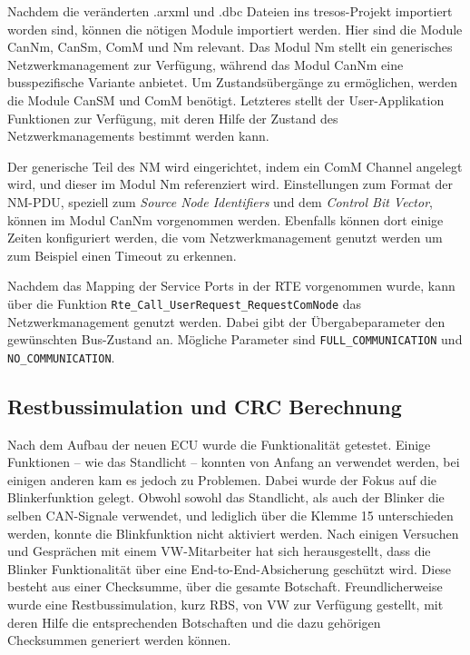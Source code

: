 \documentclass[
  a4paper,					    %
  twoside,
  DIV=calc,     				%
  bibliography=totoc,
  cleardoublepage=empty,
  ngerman,     					%
  final       					%
]{scrbook}
\begin{document}
Nachdem die veränderten .arxml und .dbc Dateien ins tresos-Projekt importiert worden sind, können die nötigen Module importiert werden. Hier sind die Module CanNm, CanSm, ComM und Nm relevant. Das Modul Nm stellt ein generisches Netzwerkmanagement zur Verfügung, während das Modul CanNm eine busspezifische Variante anbietet. Um Zustandsübergänge zu ermöglichen, werden die Module CanSM und ComM benötigt. Letzteres stellt der User-Applikation Funktionen zur Verfügung, mit deren Hilfe der Zustand des Netzwerkmanagements bestimmt werden kann.

Der generische Teil des NM wird eingerichtet, indem ein ComM Channel angelegt wird, und dieser im Modul Nm referenziert wird. Einstellungen zum Format der NM-PDU, speziell zum \emph{Source Node Identifiers} und dem \emph{Control Bit Vector}, können im Modul CanNm vorgenommen werden. Ebenfalls können dort einige Zeiten konfiguriert werden, die vom Netzwerkmanagement genutzt werden um zum Beispiel einen Timeout zu erkennen.

Nachdem das Mapping der Service Ports in der RTE vorgenommen wurde, kann über die Funktion \texttt{Rte\_Call\_UserRequest\_RequestComNode} das Netzwerkmanagement genutzt werden. Dabei gibt der Übergabeparameter den gewünschten Bus-Zustand an. Mögliche Parameter sind \texttt{FULL\_COMMUNICATION} und \texttt{NO\_COMMUNICATION}.




\subsection{Restbussimulation und CRC Berechnung}
\label{sec:RBS}
Nach dem Aufbau der neuen ECU wurde die Funktionalität getestet. Einige Funktionen -- wie das Standlicht -- konnten von Anfang an verwendet werden, bei einigen anderen kam es jedoch zu Problemen. Dabei wurde der Fokus auf die Blinkerfunktion gelegt. Obwohl sowohl das Standlicht, als auch der Blinker die selben CAN-Signale verwendet, und lediglich über die Klemme 15 unterschieden werden, konnte die Blinkfunktion nicht aktiviert werden. Nach einigen Versuchen und Gesprächen mit einem VW-Mitarbeiter hat sich herausgestellt, dass die Blinker Funktionalität über eine End-to-End-Absicherung geschützt wird. Diese besteht aus einer Checksumme, über die gesamte Botschaft. Freundlicherweise wurde eine Restbussimulation, kurz RBS, von VW zur Verfügung gestellt, mit deren Hilfe die entsprechenden Botschaften und die dazu gehörigen Checksummen generiert werden können. 
\end{document}

